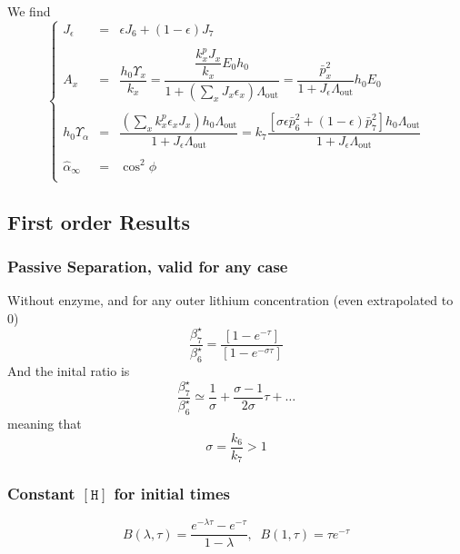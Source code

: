 \documentclass[aps,onecolumn,12pt]{revtex4}
\newcommand{\mychem}[1]{\mathtt{#1}}
\newcommand{\myconc}[1]{\left\lbrack{#1}\right\rbrack}
\newcommand{\spproton}{\mychem{H}}
\newcommand{\proton}{\myconc{\spproton}}
\newcommand{\LiAll}{\Lambda}
\newcommand{\LiAllOut}{{\LiAll}_{\mathrm{out}}}
\begin{document}
We find
\begin{equation}
\left\lbrace
\begin{array}{ccl}
	J_\epsilon & = & \epsilon J_6 + (1-\epsilon) J_7 \\
	\\
	A_x & = & \dfrac{h_0\Upsilon_x}{k_x} = \dfrac{\dfrac{k_x^p J_x}{k_x}   E_0 h_0}{1+\left(\sum_x J_x \epsilon_x \right) \LiAllOut} =  \dfrac{\bar{p}_x^2}{1+J_\epsilon \LiAllOut} h_0 E_0 \\
	\\
	h_0\Upsilon_\alpha & = & \dfrac{\left(\sum_x k_x^p \epsilon_x J_x \right)h_0\LiAllOut}{1+J_\epsilon\LiAllOut} = 
	 k_7 \dfrac{\left[\sigma \epsilon \bar{p}_6^2 + (1-\epsilon) \bar{p}_7^2 \right] h_0 \LiAllOut }{1+J_\epsilon \LiAllOut}  \\
	 \\
	\hat{\alpha}_\infty & = & \cos^2 \phi\\
\end{array}
\right.
\end{equation}

\subsection{First order Results}

\subsubsection{Passive Separation, valid for any case}
Without enzyme, and for any outer lithium concentration (even extrapolated to 0)
\begin{equation}
	\dfrac{\beta_7^\star}{\beta_6^\star} = \dfrac{  \left[1-e^{-\tau}\right]}{  \left[1-e^{-\sigma\tau}\right]}
\end{equation}
And the inital ratio is
\begin{equation}
	\dfrac{\beta_7^\star}{\beta_6^\star} \simeq \dfrac{1}{\sigma} + \dfrac{\sigma-1}{2\sigma} \tau + \ldots
\end{equation}
meaning that 
\begin{equation}
	\sigma = \dfrac{k_6}{k_7} > 1
\end{equation}

\subsubsection{Constant $\proton$ for initial times}
\begin{equation}
	B(\lambda,\tau) = \dfrac{e^{-\lambda\tau}-e^{-\tau}}{1-\lambda},\;\;B(1,\tau) = \tau e^{-\tau}
\end{equation}
\end{document}
